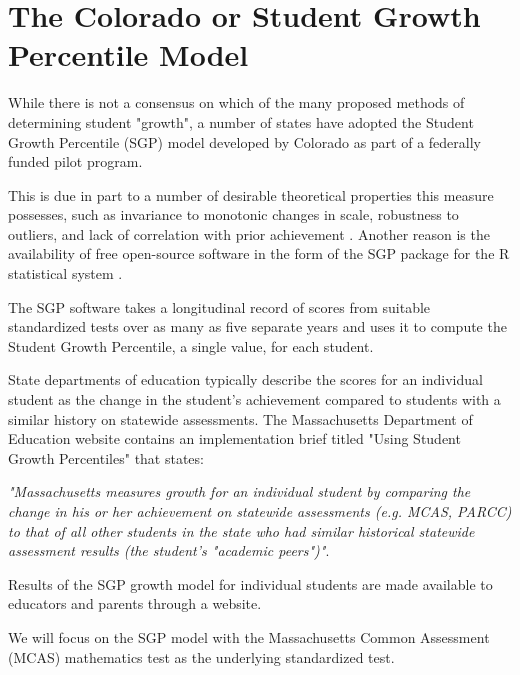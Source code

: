 \documentclass[reqno,12pt]{amsart}
\theoremstyle{plain}
\numberwithin{equation}{section} %
\numberwithin{figure}{section} %
\theoremstyle{remark}
\begin{document}
\section{The Colorado or Student Growth Percentile Model}
While there is not a consensus on which of the many proposed methods of determining student "growth", a number of states have adopted the Student Growth Percentile (SGP) model developed by Colorado as part of a federally funded pilot program.  
\par\vspace{0.3 cm}
This is due in part to a number of desirable theoretical properties this measure possesses, such as invariance to monotonic changes in scale, robustness to outliers, and lack of correlation with prior achievement \cite{bb3}.  Another reason is the availability of free open-source software in the form of the SGP package for the R statistical system \cite{bb2}.   
\par\vspace{0.3 cm}
The SGP software takes a longitudinal record of scores from suitable standardized tests over as many as five separate years and uses it to compute the Student Growth Percentile, a single value, for each student. 
\par\vspace{0.3 cm}
State departments of education typically describe the scores for an individual student as the change in the student's achievement compared to students with a similar history on statewide assessments.  The Massachusetts Department of Education website contains an implementation brief titled "Using Student Growth Percentiles" \cite{mdoe1} that states:
\par\vspace{0.3 cm}
\textit{"Massachusetts measures growth for an individual student by comparing the change in his or her achievement on statewide assessments (e.g. MCAS, PARCC) to that of all other students in the state who had
similar historical statewide assessment results (the student's "academic peers")"}.
\par\vspace{0.3 cm}
Results of the SGP growth model for individual students are made available to educators and parents through a website.
\par\vspace{0.3 cm}
We will focus on the SGP model with the Massachusetts Common Assessment (MCAS) mathematics test as the underlying standardized test. 
\vspace{0.4cm}
\end{document}

